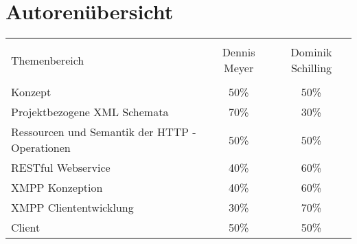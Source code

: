 
\chapter{Autorenübersicht}

\begin{table}[H]

\centering
\begin{tabular}{l c c}
\\ [-0.5ex]
\hline\hline
\\ [-0.5ex]
Themenbereich & Dennis Meyer & Dominik Schilling
\\ [1.5ex]
\hline
\\ [-0.5ex]
Konzept & 50\% & 50\% \\[1ex]
Projektbezogene XML Schemata & 70\% & 30\% \\[1ex]
Ressourcen und Semantik der HTTP - Operationen & 50\% & 50\% \\[1ex]
RESTful Webservice & 40\% & 60\% \\[1ex]
XMPP Konzeption & 40\% & 60\%\\[1ex]
XMPP Cliententwicklung & 30\% & 70\%\\[1ex]
Client & 50\% & 50\% \\[1ex]
\hline
\end{tabular}
\label{tab:autoren}
\end{table}
